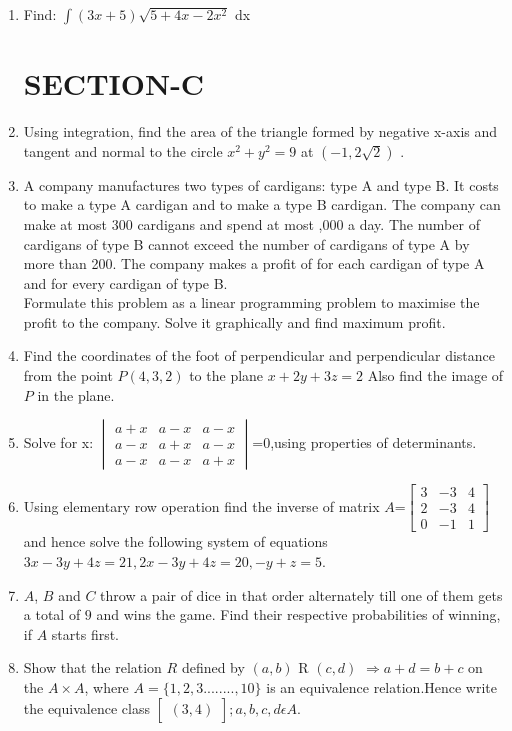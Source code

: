 \documentclass[12pt,-letter paper]{article}
\providecommand{\mydet}[1]{\ensuremath{\begin{vmatrix}#1\end{vmatrix}}}
\providecommand{\myvec}[1]{\ensuremath{\begin{bmatrix}#1\end{bmatrix}}}
\providecommand{\brak}[1]{\ensuremath{\left(#1\right)}}
\begin{document}
\begin{enumerate}
      \item Find: $\int \brak{3x+5}\sqrt {5+4x-2x^2}$ dx

	      \section*{\centering SECTION-C}	      

      \item Using integration, find the area of the triangle formed by negative x-axis and tangent and normal to the circle $x ^ 2 + y ^ 2 = 9$ at $\brak{- 1, 2\sqrt2}$ .  					     
      \item A company manufactures two types of cardigans: type A and type B. It costs  to make a type A cardigan and  to make a type B cardigan. The company can make at most $300$ cardigans and spend at most ,000 a day. The number of cardigans of type B cannot exceed the number of cardigans of type A by more than 200. The company makes a profit of  for each cardigan of type A and  for every cardigan of type B.\\Formulate this problem as a linear programming problem to maximise the profit to the company. Solve it graphically and find maximum profit.

       \item Find the coordinates of the foot of perpendicular and perpendicular distance from the point $P\brak{4, 3, 2}$ to the plane $x + 2y + 3z = 2$ Also find the image of $P$ in the plane.  
       \item  Solve for x: $\mydet{a+x&a-x&a-x\\ a-x&a+x&a-x\\a-x&a-x&a+x}$=$0$,using properties of determinants.
       \item  Using elementary row operation find the inverse of matrix  $A$=$\myvec{3&-3&4\\2&-3&4\\0&-1&1}$ and hence solve the following system of equations $3x-3y+4z=21,2x-3y+4z=20,-y+z=5$.                                                 
        \item $A$, $B$ and $C$ throw a pair of dice in that order alternately till one of them gets a total of $9$ and wins the game. Find their respective probabilities of winning, if $A$ starts first.
       
	\item Show that the relation $R$ defined by \brak{a,b} R \brak{c,d} $\Rightarrow a+d=b+c $ on the $A \times A$, where $A=\{1,2,3........,10\}$ is an equivalence relation.Hence write the equivalence class $\myvec{\brak{3,4}};a,b,c,d \epsilon A$.


\end{enumerate}
\end{document}
